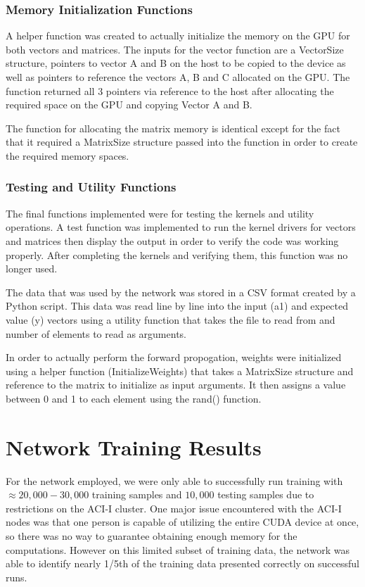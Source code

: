 \documentclass[11pt]{article}
\begin{document}
\subsubsection{Memory Initialization Functions}
A helper function was created to actually initialize the memory on the GPU for both vectors and matrices. The inputs for the vector function are a VectorSize structure, pointers to vector A and B on the host to be copied to the device as well as pointers to reference the vectors A, B and C allocated on the GPU. The function returned all 3 pointers via reference to the host after allocating the required space on the GPU and copying Vector A and B.

The function for allocating the matrix memory is identical except for the fact that it required a MatrixSize structure passed into the function in order to create the required memory spaces.

\subsubsection{Testing and Utility Functions}
The final functions implemented were for testing the kernels and utility operations. A test function was implemented to run the kernel drivers for vectors and matrices then display the output in order to verify the code was working properly. After completing the kernels and verifying them, this function was no longer used.

The data that was used by the network was stored in a CSV format created by a Python script. This data was read line by line into the input (a1) and expected value (y) vectors using a utility function that takes the file to read from and number of elements to read as arguments.

In order to actually perform the forward propogation, weights were initialized using a helper function (InitializeWeights) that takes a MatrixSize structure and reference to the matrix to initialize as input arguments. It then assigns a value between 0 and 1 to each element using the rand() function.

\section{Network Training Results}
For the network employed, we were only able to successfully run training with $\approx 20,000-30,000$ training samples and $10,000$ testing samples due to restrictions on the ACI-I cluster. One major issue encountered with the ACI-I nodes was that one person is capable of utilizing the entire CUDA device at once, so there was no way to guarantee obtaining enough memory for the computations. However on this limited subset of training data, the network was able to identify nearly 1/5th of the training data presented correctly on successful runs.
\end{document}
